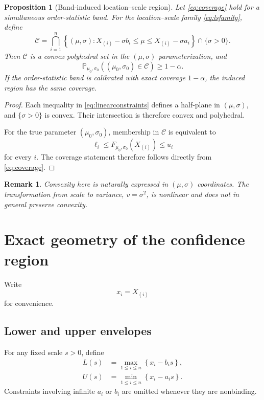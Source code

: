 \documentclass[11pt]{article}
\newtheorem{proposition}{Proposition}
\newtheorem{remark}{Remark}
\newcommand{\Pp}{\mathbb{P}}
\newcommand{\cC}{\mathcal{C}}
\begin{document}
\begin{proposition}[Band-induced location--scale region]
\label{prop:polyhedral}
Let \eqref{eq:coverage} hold for a simultaneous order-statistic band.
For the location--scale family \eqref{eq:lsfamily}, define
\begin{equation}
    \cC
    =
    \bigcap_{i=1}^n
    \left\{
        (\mu,\sigma):
        X_{(i)}-\sigma b_i
        \leq
        \mu
        \leq
        X_{(i)}-\sigma a_i
    \right\}
    \cap
    \{\sigma>0\}.
    \label{eq:C}
\end{equation}
Then $\cC$ is a convex polyhedral set in the $(\mu,\sigma)$
parameterization, and
\[
    \Pp_{\mu_0,\sigma_0}
    \left(
        (\mu_0,\sigma_0)\in\cC
    \right)
    \geq
    1-\alpha.
\]
If the order-statistic band is calibrated with exact coverage
$1-\alpha$, the induced region has the same coverage.
\end{proposition}

\begin{proof}
Each inequality in \eqref{eq:linearconstraints} defines a half-plane in
$(\mu,\sigma)$, and $\{\sigma>0\}$ is convex.  Their intersection is
therefore convex and polyhedral.

For the true parameter $(\mu_0,\sigma_0)$,
membership in $\cC$ is equivalent to
\[
    \ell_i
    \leq
    F_{\mu_0,\sigma_0}(X_{(i)})
    \leq
    u_i
\]
for every $i$.  The coverage statement therefore follows directly from
\eqref{eq:coverage}.
\end{proof}

\begin{remark}
Convexity here is naturally expressed in $(\mu,\sigma)$ coordinates.
The transformation from scale to variance,
$v=\sigma^2$, is nonlinear and does not in general preserve convexity.
\end{remark}


\section{Exact geometry of the confidence region}

Write
\[
    x_i=X_{(i)}
\]
for convenience.

\subsection{Lower and upper envelopes}

For any fixed scale $s>0$, define
\begin{align}
    L(s)
    &=
    \max_{1\leq i\leq n}
    \left\{
        x_i-b_i s
    \right\},
    \label{eq:L}
    \\
    U(s)
    &=
    \min_{1\leq i\leq n}
    \left\{
        x_i-a_i s
    \right\}.
    \label{eq:U}
\end{align}
Constraints involving infinite $a_i$ or $b_i$ are omitted whenever they
are nonbinding.
\end{document}
